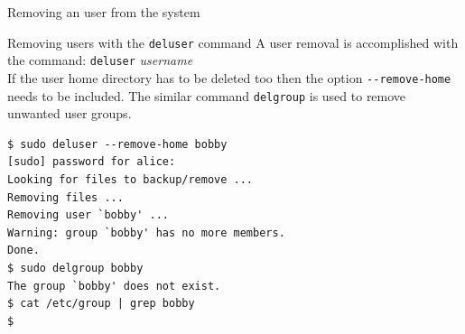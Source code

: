 \begin{frame}[t,fragile]{Removing an user from the system}


  \begin{block}{Removing users with the \alert{\texttt{deluser}} command}
    {\footnotesize
A user removal is accomplished with the command: \alert{\texttt{deluser} \emph{username}}\\ 
If the user home directory has to be deleted too then the option \texttt{{-}-remove-home} needs to be included. The similar command \alert{\texttt{delgroup}} is used to remove unwanted user groups.}

{\footnotesize
  \begin{lstlisting}
$ sudo deluser --remove-home bobby
[sudo] password for alice: 
Looking for files to backup/remove ...
Removing files ...
Removing user `bobby' ...
Warning: group `bobby' has no more members.
Done.
$ sudo delgroup bobby
The group `bobby' does not exist.
$ cat /etc/group | grep bobby
$ 
  \end{lstlisting}
}

  \end{block}
  
\end{frame}
